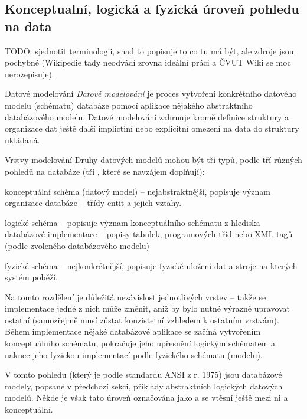\subsection{Konceptualní, logická a fyzická úroveň pohledu na data}

TODO: sjednotit terminologii, snad to popisuje to co tu má být, ale zdroje jsou pochybné (Wikipedie tady neodvádí zrovna ideální práci a ČVUT Wiki se moc nerozepisuje).

\begin{definiceN}{Datové modelování}
\emph{Datové modelování} je proces vytvoření konkrétního datového modelu (schématu) databáze pomocí aplikace nějakého abstraktního databázového modelu. Datové modelování zahrnuje kromě definice struktury a organizace dat ještě další implictiní nebo explicitní omezení na data do struktury ukládaná. 
\end{definiceN}

\begin{obecne}{Vrstvy modelování}
Druhy datových modelů mohou být tří typů, podle tří různých pohledů na databáze (tři , které se navzájem doplňují):
\begin{pitemize}
    \item konceptuální schéma (datový model) -- nejabstraktnější, popisuje význam organizace databáze -- třídy entit a jejich vztahy.
    \item logické schéma -- popisuje význam konceptuálního schématu z hlediska databázové implementace -- popisy tabulek, programových tříd nebo XML tagů (podle zvoleného databázového modelu)
    \item fyzické schéma -- nejkonkrétnější, popisuje fyzické uložení dat a stroje na kterých systém poběží.
\end{pitemize}
Na tomto rozdělení je důležitá nezávislost jednotlivých vrstev -- takže se implementace jedné z nich může změnit, aniž by bylo nutné výrazně upravovat ostatní (samozřejmě musí zůstat konzistetní vzhledem k ostatním vrstvám). Během implementace nějaké databázové aplikace se začíná vytvořením konceptuálního schématu, pokračuje jeho upřesnění logickým schématem a naknec jeho fyzickou implementací podle fyzického schématu (modelu).
\end{obecne}

\begin{poznamka}
V tomto pohledu (který je podle standardu ANSI z r. 1975) jsou databázové modely, popsané v předchozí sekci, příklady abstraktních logických datových modelů. Někde je však tato úroveň označována jako  a  se vtěsní ještě mezi ni a konceptuální.
\end{poznamka}


